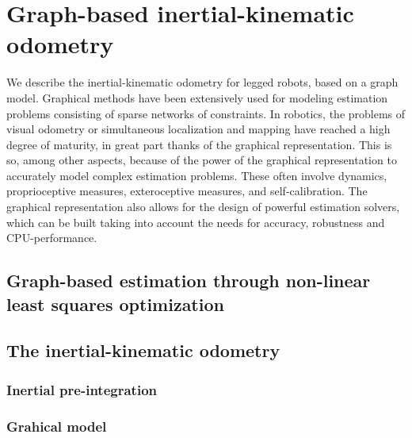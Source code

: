 
\section{Graph-based inertial-kinematic odometry}

We describe the inertial-kinematic odometry for legged robots, based on a graph model. 
Graphical methods have been extensively used for modeling estimation problems consisting of sparse networks of constraints. 
In robotics, the problems of visual odometry or simultaneous localization and mapping have reached a high degree of maturity, in great part thanks of the graphical representation. 
This is so, among other aspects, because of the power of the graphical representation to accurately model complex estimation problems. 
These often involve dynamics, proprioceptive measures, exteroceptive measures, and self-calibration. 
The graphical representation also allows for the design of powerful estimation solvers, which can be built taking into account the needs for accuracy, robustness and CPU-performance.

\subsection{Graph-based estimation through non-linear least squares optimization}

\subsection{The inertial-kinematic odometry}

\subsubsection{Inertial pre-integration}

\subsubsection{Grahical model}

